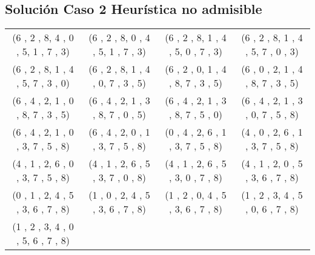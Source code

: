 \documentclass[11pt]{article}
\begin{document}
\subsection{Solución Caso 2 Heurística no admisible}
\begin{tabular}{c c c c}
(6 , 2 , 8,
4 , 0 , 5,
1 , 7 , 3)
&

(6 , 2 , 8,
0 , 4 , 5,
1 , 7 , 3)
&

(6 , 2 , 8,
1 , 4 , 5,
0 , 7 , 3)
&

(6 , 2 , 8,
1 , 4 , 5,
7 , 0 , 3)
\\

(6 , 2 , 8,
1 , 4 , 5,
7 , 3 , 0)
&

(6 , 2 , 8,
1 , 4 , 0,
7 , 3 , 5)
&

(6 , 2 , 0,
1 , 4 , 8,
7 , 3 , 5)
&

(6 , 0 , 2,
1 , 4 , 8,
7 , 3 , 5)
\\

(6 , 4 , 2,
1 , 0 , 8,
7 , 3 , 5)
&

(6 , 4 , 2,
1 , 3 , 8,
7 , 0 , 5)
&

(6 , 4 , 2,
1 , 3 , 8,
7 , 5 , 0)
&

(6 , 4 , 2,
1 , 3 , 0,
7 , 5 , 8)
\\

(6 , 4 , 2,
1 , 0 , 3,
7 , 5 , 8)
&

(6 , 4 , 2,
0 , 1 , 3,
7 , 5 , 8)
&

(0 , 4 , 2,
6 , 1 , 3,
7 , 5 , 8)
&

(4 , 0 , 2,
6 , 1 , 3,
7 , 5 , 8)
\\

(4 , 1 , 2,
6 , 0 , 3,
7 , 5 , 8)
&

(4 , 1 , 2,
6 , 5 , 3,
7 , 0 , 8)
&

(4 , 1 , 2,
6 , 5 , 3,
0 , 7 , 8)
&

(4 , 1 , 2,
0 , 5 , 3,
6 , 7 , 8)
\\

(0 , 1 , 2,
4 , 5 , 3,
6 , 7 , 8)
&

(1 , 0 , 2,
4 , 5 , 3,
6 , 7 , 8)
&

(1 , 2 , 0,
4 , 5 , 3,
6 , 7 , 8)
&

(1 , 2 , 3,
4 , 5 , 0,
6 , 7 , 8)
\\

(1 , 2 , 3,
4 , 0 , 5,
6 , 7 , 8)
&

&

&
\\
\end{tabular}
\clearpage
\end{document}
